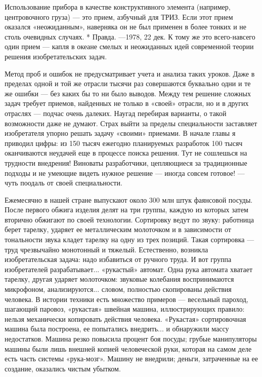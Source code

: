 Использование прибора  в качестве конструктивного  элемента (например,
центровочного груза) —  это прием, азбучный для ТРИЗ.  Если этот прием
оказался «неожиданным», наверняка он не  был применен в более тонких и
не столь  очевидных случаях. *  Правда. —1978, 22  дек. К тому  же это
всего-навсего один  прием — капля  в океане смелых и  неожиданных идей
современной теории решения изобретательских задач.


Метод проб и  ошибок не предусматривает учета и  анализа таких уроков.
Даже  в  пределах  одной  и  той же  отрасли  тысячи  раз  совершаются
буквально одни и те же ошибки — без каких бы то ни было выводов. Между
тем  решение сложных  задач  требует приемов,  найденных  не только  в
«своей» отрасли, но и в других отраслях — подчас очень далеких. Наугад
перебирая варианты, о такой возможности даже не думают. Страх выйти за
пределы  специальности заставляет  изобретателя  упорно решать  задачу
«своими»  приемами. В  начале главы  я  приводил цифры:  из 150  тысяч
ежегодно планируемых разработок 100  тысяч оканчиваются неудачей еще в
процессе  поиска решения.  Тут  не сошлешься  на трудности  внедрения!
Виноваты  разработчики,  цепляющиеся  за  традиционные  подходы  и  не
умеющие видеть нужное решение —  иногда совсем готовое! — чуть поодаль
от своей специальности.

Ежемесячно  в нашей  стране  выпускают около  300  млн штук  фаянсовой
посуды. После  первого обжига изделия  делят на три группы,  каждую из
которых затем вторично обжигают  по своей технологии. Сортировку ведут
по звуку: работница берет тарелку, ударяет ее металлическим молоточком
и в  зависимости от тональности звука  кладет тарелку на одну  из трех
позиций.  Такая сортировка  — труд  чрезвычайно монотонный  и тяжелый.
Естественно,   возникла  изобретательская   задача:  надо   избавиться
от  ручного   труда.  И  вот  группа   изобретателей  разрабатывает...
«рукастый»  автомат.  Одна  рука   автомата  хватает  тарелку,  другая
ударяет  молоточком:  звуковые  колебания  воспринимаются  микрофоном,
анализируются...  словом, полностью  скопированы действия  человека. В
истории техники есть множество  примеров — весельный пароход, шагающий
паровоз,  «рукастая» швейная  машина,  иллюстрирующих правило:  нельзя
механически  копировать  действия человека.  «Рукастая»  сортировочная
машина была  построена, ее  попытались внедрить... и  обнаружили массу
недостатков.  Машина   резко  повысила  процент  боя   посуды;  грубые
манипуляторы  машины  были  лишь  внешней  копией  человеческой  руки,
которая  на  самом деле  есть  часть  системы «рука-мозг».  Машину  не
внедрили;  деньги,  затраченные  на   ее  создание,  оказались  чистым
убытком.

